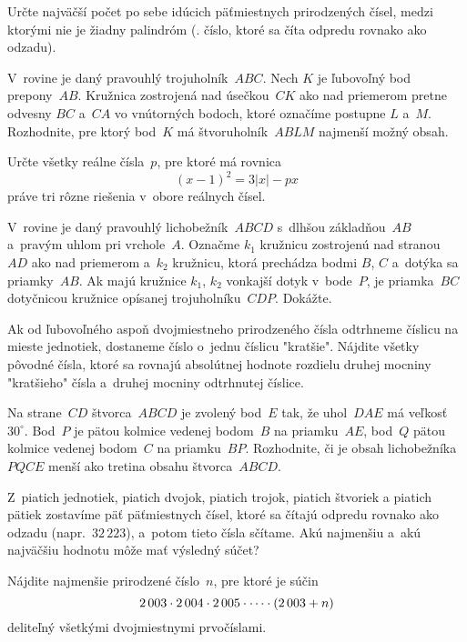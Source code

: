 {%
Určte najväčší počet po sebe idúcich päťmiestnych prirodzených čísel, medzi ktorými nie je žiadny palindróm (\tj. číslo, ktoré sa číta odpredu rovnako ako odzadu).}

{%
V~rovine je daný pravouhlý trojuholník~$ABC$. Nech $K$ je ľubovoľný bod prepony~$AB$. Kružnica zostrojená nad úsečkou~$CK$ ako nad priemerom pretne odvesny $BC$ a~$CA$ vo vnútorných bodoch, ktoré označíme postupne $L$ a~$M$. Rozhodnite, pre ktorý bod~$K$ má štvoruholník~$ABLM$ najmenší možný obsah.}

{%
Určte všetky reálne čísla~$p$, pre ktoré má rovnica
$$
(x-1)^2=3|x|-px
$$
práve tri rôzne riešenia v~obore reálnych čísel.}

{%
V~rovine je daný pravouhlý lichobežník~$ABCD$ s~dlhšou základňou~$AB$ a~pravým uhlom pri vrchole~$A$. Označme $k_1$ kružnicu zostrojenú nad stranou~$AD$ ako nad priemerom a~$k_2$ kružnicu, ktorá prechádza bodmi $B$, $C$ a~dotýka sa priamky~$AB$. Ak majú kružnice $k_1$, $k_2$ vonkajší dotyk v~bode~$P$, je priamka~$BC$ dotyčnicou kružnice opísanej trojuholníku~$CDP$. Dokážte.}

{%
Ak od ľubovoľného aspoň dvojmiestneho prirodzeného čísla odtrhneme číslicu na mieste jednotiek, dostaneme číslo o~jednu číslicu "kratšie". Nájdite všetky pôvodné čísla, ktoré sa rovnajú absolútnej hodnote rozdielu druhej mocniny "kratšieho" čísla a~druhej mocniny odtrhnutej číslice.}

{%
Na strane~$CD$ štvorca~$ABCD$ je zvolený bod~$E$ tak, že uhol~$DAE$ má veľkosť~$30^{\circ}$. Bod~$P$ je pätou kolmice vedenej bodom~$B$ na priamku~$AE$, bod~$Q$ pätou kolmice vedenej bodom~$C$ na priamku~$BP$. Rozhodnite, či je obsah lichobežníka~$PQCE$ menší ako tretina obsahu štvorca~$ABCD$.}

{%
Z~piatich jednotiek, piatich dvojok, piatich trojok, piatich štvoriek a piatich pätiek zostavíme päť päťmiestnych čísel, ktoré sa čítajú odpredu rovnako ako odzadu (napr.~$32\,223$), a~potom tieto čísla sčítame. Akú najmenšiu a~akú najväčšiu hodnotu môže mať výsledný súčet?}

{%
Nájdite najmenšie prirodzené číslo~$n$, pre ktoré je súčin
$$
\postdisplaypenalty 10000
2\,003\cdot2\,004\cdot2\,005\cdot\dots\cdot(2\,003+n)
$$
deliteľný všetkými dvojmiestnymi prvočíslami.}

